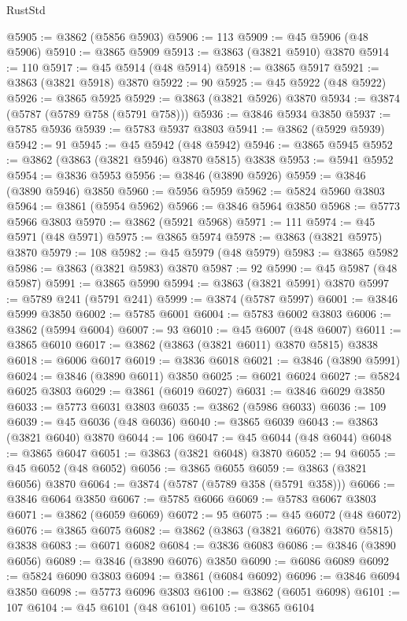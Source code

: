 \begin{lexlean}{RustStd}
\begin{coremodule}
@5905 := @3862 (@5856 @5903)
@5906 := 113
@5909 := @45 @5906 (@48 @5906)
@5910 := @3865 @5909
@5913 := @3863 (@3821 @5910) @3870
@5914 := 110
@5917 := @45 @5914 (@48 @5914)
@5918 := @3865 @5917
@5921 := @3863 (@3821 @5918) @3870
@5922 := 90
@5925 := @45 @5922 (@48 @5922)
@5926 := @3865 @5925
@5929 := @3863 (@3821 @5926) @3870
@5934 := @3874 (@5787 (@5789 @758 (@5791 @758)))
@5936 := @3846 @5934 @3850
@5937 := @5785 @5936
@5939 := @5783 @5937 @3803
@5941 := @3862 (@5929 @5939)
@5942 := 91
@5945 := @45 @5942 (@48 @5942)
@5946 := @3865 @5945
@5952 := @3862 (@3863 (@3821 @5946) @3870 @5815) @3838
@5953 := @5941 @5952
@5954 := @3836 @5953
@5956 := @3846 (@3890 @5926)
@5959 := @3846 (@3890 @5946) @3850
@5960 := @5956 @5959
@5962 := @5824 @5960 @3803
@5964 := @3861 (@5954 @5962)
@5966 := @3846 @5964 @3850
@5968 := @5773 @5966 @3803
@5970 := @3862 (@5921 @5968)
@5971 := 111
@5974 := @45 @5971 (@48 @5971)
@5975 := @3865 @5974
@5978 := @3863 (@3821 @5975) @3870
@5979 := 108
@5982 := @45 @5979 (@48 @5979)
@5983 := @3865 @5982
@5986 := @3863 (@3821 @5983) @3870
@5987 := 92
@5990 := @45 @5987 (@48 @5987)
@5991 := @3865 @5990
@5994 := @3863 (@3821 @5991) @3870
@5997 := @5789 @241 (@5791 @241)
@5999 := @3874 (@5787 @5997)
@6001 := @3846 @5999 @3850
@6002 := @5785 @6001
@6004 := @5783 @6002 @3803
@6006 := @3862 (@5994 @6004)
@6007 := 93
@6010 := @45 @6007 (@48 @6007)
@6011 := @3865 @6010
@6017 := @3862 (@3863 (@3821 @6011) @3870 @5815) @3838
@6018 := @6006 @6017
@6019 := @3836 @6018
@6021 := @3846 (@3890 @5991)
@6024 := @3846 (@3890 @6011) @3850
@6025 := @6021 @6024
@6027 := @5824 @6025 @3803
@6029 := @3861 (@6019 @6027)
@6031 := @3846 @6029 @3850
@6033 := @5773 @6031 @3803
@6035 := @3862 (@5986 @6033)
@6036 := 109
@6039 := @45 @6036 (@48 @6036)
@6040 := @3865 @6039
@6043 := @3863 (@3821 @6040) @3870
@6044 := 106
@6047 := @45 @6044 (@48 @6044)
@6048 := @3865 @6047
@6051 := @3863 (@3821 @6048) @3870
@6052 := 94
@6055 := @45 @6052 (@48 @6052)
@6056 := @3865 @6055
@6059 := @3863 (@3821 @6056) @3870
@6064 := @3874 (@5787 (@5789 @358 (@5791 @358)))
@6066 := @3846 @6064 @3850
@6067 := @5785 @6066
@6069 := @5783 @6067 @3803
@6071 := @3862 (@6059 @6069)
@6072 := 95
@6075 := @45 @6072 (@48 @6072)
@6076 := @3865 @6075
@6082 := @3862 (@3863 (@3821 @6076) @3870 @5815) @3838
@6083 := @6071 @6082
@6084 := @3836 @6083
@6086 := @3846 (@3890 @6056)
@6089 := @3846 (@3890 @6076) @3850
@6090 := @6086 @6089
@6092 := @5824 @6090 @3803
@6094 := @3861 (@6084 @6092)
@6096 := @3846 @6094 @3850
@6098 := @5773 @6096 @3803
@6100 := @3862 (@6051 @6098)
@6101 := 107
@6104 := @45 @6101 (@48 @6101)
@6105 := @3865 @6104

\end{coremodule}
\end{lexlean}
